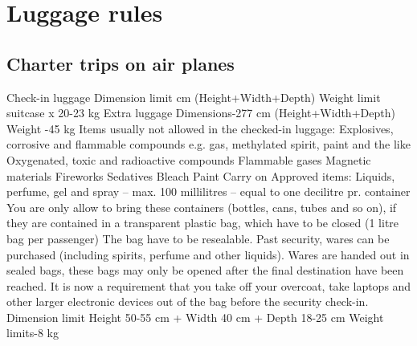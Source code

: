 \section{Luggage rules}

\subsection{Charter trips on air planes}

Check-in luggage
\newline
Dimension limit\indent\indent{} cm (Height+Width+Depth)
\newline
Weight limit\indent\indent\indent{} suitcase x 20-23 kg
\newline\newline
Extra luggage
\newline
Dimensions\indent\indent\indent{}-277 cm (Height+Width+Depth)
\newline
Weight \indent\indent\indent \indent{}-45 kg
\newline\newline
Items usually not allowed in the checked-in luggage:
\newline
Explosives, corrosive and flammable compounds e.g. gas, methylated spirit, paint and the like  
\newline
Oxygenated, toxic and radioactive compounds 
\newline
Flammable gases 
\newline
Magnetic materials 
\newline
Fireworks 
\newline
Sedatives 
\newline
Bleach 
\newline
Paint
\newline\newline
Carry on
Approved items: Liquids, perfume, gel and spray – max. 100 millilitres – equal to one decilitre pr. container
You are only allow to bring these containers (bottles, cans, tubes and so on), if they are contained in a transparent plastic bag, which have to be closed (1 litre bag per passenger)
The bag have to be resealable.
\newline
Past security, wares can be purchased (including spirits, perfume and other liquids). Wares are handed out in sealed bags, these bags may only be opened after the final destination have been reached.
\newline
It is now a requirement that you take off your overcoat, take laptops and other larger electronic devices out of the bag before the security check-in.
\newline\newline
Dimension limit \indent\indent\indent	Height 50-55 cm + Width 40 cm + Depth 18-25 cm
\newline
Weight limits\indent\indent\indent{}-8 kg

